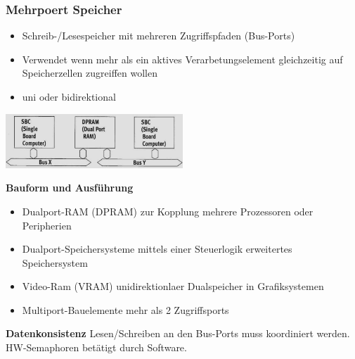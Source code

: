 \subsubsection{Mehrpoert Speicher}
\begin{itemize}
    \item Schreib-/Lesespeicher mit mehreren Zugriffspfaden (Bus-Ports)
    \item Verwendet wenn mehr als ein aktives Verarbetungselement gleichzeitig auf Speicherzellen zugreiffen wollen
    \item uni oder bidirektional
\end{itemize}
\begin{minipage}{0.5\linewidth}
    \includegraphics[width=0.5\textwidth]{images/SystembusSpeicherSpeichersystem/SpeicherSysMehrPort}
\end{minipage}\newline
\textbf{Bauform und Ausführung}
\begin{itemize}
    \item Dualport-RAM (DPRAM)
    \subitem zur Kopplung mehrere Prozessoren oder Peripherien
    \item Dualport-Speichersysteme
    \subitem mittels einer Steuerlogik erweitertes Speichersystem
    \item Video-Ram (VRAM)
    \subitem unidirektionlaer Dualspeicher in Grafiksystemen
    \item Multiport-Bauelemente
    \subitem mehr als 2 Zugriffsports
\end{itemize}
\textbf{Datenkonsistenz}\newline
Lesen/Schreiben an den Bus-Ports muss koordiniert werden. HW-Semaphoren betätigt durch Software.

